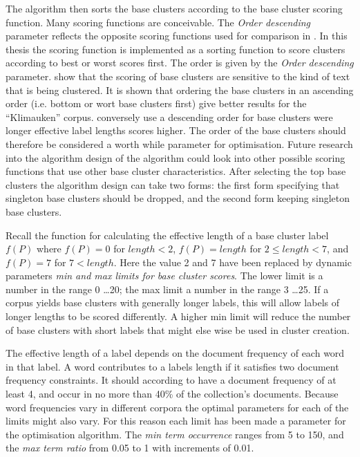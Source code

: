 The algorithm then sorts the base clusters according to the base cluster scoring function. Many scoring functions are conceivable. The \emph{Order descending} parameter reflects the opposite scoring functions used for comparison in \cite{Moe2014}. In this thesis the scoring function is implemented as a sorting function to score clusters according to best or worst scores first. The order is given by the \emph{Order descending} parameter. \cite{Moe2014,Moe2013compact} show that the scoring of base clusters are sensitive to the kind of text that is being clustered. It is shown that ordering the base clusters in an ascending order (i.e. bottom or wort base clusters first) give better results for the ``Klimauken'' corpus. \cite{Oren1998} conversely use a descending order for base clusters were longer effective label lengths scores higher. The order of the base clusters should therefore be considered a worth while parameter for optimisation. Future research into the algorithm design of the \CTC algorithm could look into other possible scoring functions that use other base cluster characteristics. After selecting the top base clusters the algorithm design can take two forms: the first form specifying that singleton base clusters should be dropped, and the second form keeping singleton base clusters.

Recall the function for calculating the effective length of a base cluster label \(f(P)\) where \(f(P) = 0\) for \(length < 2\), \(f(P) = length\) for \(2 \le length < 7\), and \(f(P) = 7\) for \(7 < length \). Here the value 2 and 7 have been replaced by dynamic parameters \emph{min and max limits for base cluster scores}. The lower limit is a number in the range 0 \dots 20; the max limit a number in the range 3 \dots 25. If a corpus yields base clusters with generally longer labels, this will allow labels of longer lengths to be scored differently. A higher min limit will reduce the number of base clusters with short labels that might else wise be used in cluster creation.

The effective length of a label depends on the document frequency of each word in that label. A word contributes to a labels length if it satisfies two document frequency constraints. It should according to \cite{Oren1998} have a document frequency of at least 4, and occur in no more than 40\% of the collection's documents. Because word frequencies vary in different corpora the optimal parameters for each of the limits might also vary. For this reason each limit has been made a parameter for the optimisation algorithm. The \emph{min term occurrence} ranges from 5 to 150, and the \emph{max term ratio} from 0.05 to 1 with increments of 0.01.

